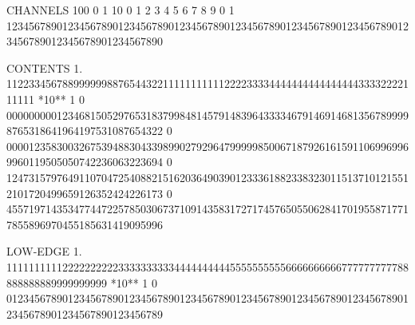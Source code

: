 \begin{Listing}
 CHANNELS 100   0                                                                                                  1   
           10   0        1         2         3         4         5         6         7         8         9         0   
            1   1234567890123456789012345678901234567890123456789012345678901234567890123456789012345678901234567890   
 
 CONTENTS   1.                 11223345678899999988765443221111111111122223333444444444444444433332222111111        
 *10**  1   0   0000000001234681505297653183799848145791483964333346791469146813567899998765318641964197531087654322
            0   0000123583003267539488304339899027929647999998500671879261615911069969969960119505050742236063223694
            0   1247315797649110704725408821516203649039012333618823383230115137101215512101720499659126352424226173
            0   4557197143534774472257850306737109143583172717457650550628417019558717717855896970455185631419095996
 
 LOW-EDGE   1.            111111111122222222223333333333444444444455555555556666666666777777777788888888889999999999
 *10**  1   0   0123456789012345678901234567890123456789012345678901234567890123456789012345678901234567890123456789
 

\end{Listing}
